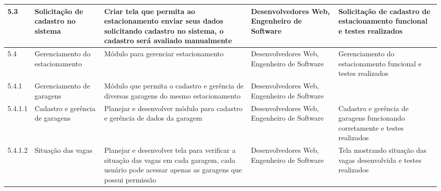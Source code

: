 \begin{landscape}
\begin{longtable}{@{\extracolsep{\fill}}  l  p{}  p{}  p{}  p{}  }
		\midrule
		5.3                    & Solicitação de cadastro no sistema                     & Criar tela que permita ao estacionamento enviar seus dados solicitando cadastro no sistema, o cadastro será avaliado manualmente                                                & Desenvolvedores Web, Engenheiro de Software                                                      & Solicitação de cadastro de estacionamento funcional e testes realizados                                \\*
		\midrule
		5.4                    & Gerenciamento do estacionamento                          & Módulo para gerenciar estacionamento                                                                                                                                            & Desenvolvedores Web, Engenheiro de Software                                                      & Gerenciamento do estacionamento funcional e testes realizados                                            \\*
		\midrule
		5.4.1                  & Gerenciamento de garagens                                & Módulo que permita o cadastro e gerência de diversas garagens do mesmo estacionamento                                                                                          & Desenvolvedores Web, Engenheiro de Software                                                      &                                                                                                          \\*
		\midrule
		5.4.1.1                & Cadastro e gerência de garagens                         & Planejar e desenvolver módulo para cadastro e gerência de dados da garagem                                                                                                     & Desenvolvedores Web, Engenheiro de Software                                                      & Cadastro e gerência de garagens funcionando corretamente e testes realizados                            \\*
		\midrule
		5.4.1.2                & Situação das vagas                                     & Planejar e desenvolver tela para verificar a situação das vagas em cada garagem, cada usuário pode acessar apenas as garagens que possui permissão                           & Desenvolvedores Web, Engenheiro de Software                                                      & Tela mostrando situação das vagas desenvolvida e testes realizados                                     \\*

\end{longtable}
\end{landscape}
